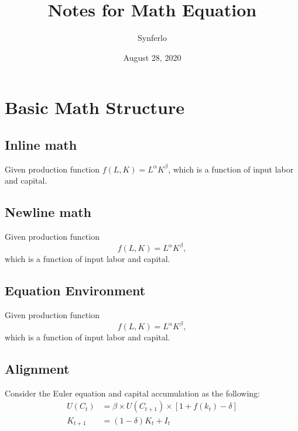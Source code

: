 \documentclass[11pt]{article}
\title{Notes for Math Equation}
\author{Synferlo}
\date{August 28, 2020}
\begin{document}
\maketitle

    \newpage
    
    \section{Basic Math Structure}
        \subsection{Inline math}
            Given production function $f(L,K)=L^\alpha K^\beta$,
            which is a function of input labor and capital.


        \subsection{Newline math}
            Given production function $$f(L,K)=L^\alpha K^\beta,$$
            which is a function of input labor and capital.


        \subsection{Equation Environment}
            Given production function
            \begin{equation*}
                f(L,K)=L^\alpha K^\beta,
            \end{equation*}
            which is a function of input labor and capital.


        \subsection{Alignment}
            Consider the Euler equation and capital accumulation as the following:
            \begin{align}
                U(C_{t})&=\beta\times U(C_{t+1})\times[1+f(k_{t})-\delta]\\
                K_{t+1}&=(1-\delta)K_{t} + I_{t}
            \end{align}\\
\end{document}
